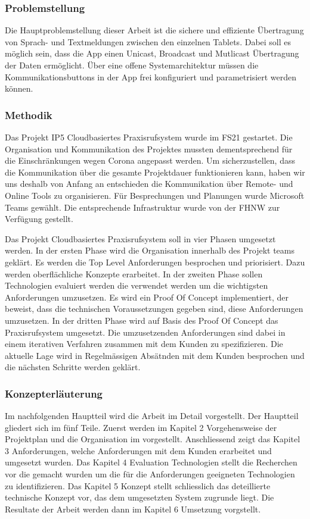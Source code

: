 \subsubsection*{Problemstellung}

Die Hauptproblemstellung dieser Arbeit ist die sichere und effiziente Übertragung von Sprach- und Textmeldungen zwischen den einzelnen Tablets.
Dabei soll es möglich sein, dass die App einen Unicast, Broadcast und Mutlicast Übertragung der Daten ermöglicht.
Über eine offene Systemarchitektur müssen die Kommunikationsbuttons in der App frei konfiguriert und parametrisiert werden können.

\subsubsection*{Methodik}

Das Projekt IP5 Cloudbasiertes Praxisrufsystem wurde im FS21 gestartet.
Die Organisation und Kommunikation des Projektes mussten dementsprechend für die Einschränkungen wegen Corona angepasst werden.
Um sicherzustellen, dass die Kommunikation über die gesamte Projektdauer funktionieren kann, haben wir uns deshalb von Anfang an entschieden die Kommunikation über Remote- und Online Tools zu organisieren.
Für Besprechungen und Planungen wurde Microsoft Teams gewählt.
Die entsprechende Infrastruktur wurde von der FHNW zur Verfügung gestellt.

Das Projekt Cloudbasiertes Praxisrufsystem soll in vier Phasen umgesetzt werden.
In der ersten Phase wird die Organisation innerhalb des Projekt teams geklärt.
Es werden die Top Level Anforderungen besprochen und priorisiert.
Dazu werden oberflächliche Konzepte erarbeitet.
In der zweiten Phase sollen Technologien evaluiert werden die verwendet werden um die wichtigsten Anforderungen umzusetzen.
Es wird ein Proof Of Concept implementiert, der beweist, dass die technischen Voraussetzungen gegeben sind, diese Anforderungen umzusetzen.
In der dritten Phase wird auf Basis des Proof Of Concept das Praxisrufsystem umgesetzt.
Die umzusetzenden Anforderungen sind dabei in einem iterativen Verfahren zusammen mit dem Kunden zu spezifizieren.
Die aktuelle Lage wird in Regelmässigen Absätnden mit dem Kunden besprochen und die nächsten Schritte werden geklärt.

\subsubsection*{Konzepterläuterung}

Im nachfolgenden Hauptteil wird die Arbeit im Detail vorgestellt.
Der Hauptteil gliedert sich im fünf Teile.
Zuerst werden im Kapitel 2 Vorgehensweise der Projektplan und die Organisation im vorgestellt.
Anschliessend zeigt das Kapitel 3 Anforderungen, welche Anforderungen mit dem Kunden erarbeitet und umgesetzt wurden.
Das Kapitel 4 Evaluation Technologien stellt die Recherchen vor die gemacht wurden um die für die Anforderungen geeigneten Technologien zu identifizieren.
Das Kapitel 5 Konzept stellt schliesslich das deteillierte technische Konzept vor, das dem umgesetzten System zugrunde liegt.
Die Resultate der Arbeit werden dann im Kapitel 6 Umsetzung vorgstellt.


\clearpage
